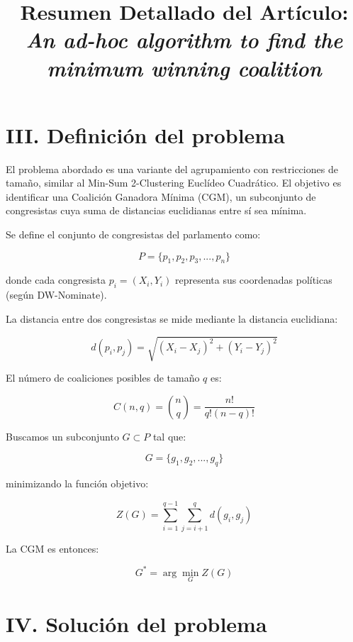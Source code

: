 \documentclass[12pt]{article}
\title{Resumen Detallado del Artículo: \\
\textit{An ad-hoc algorithm to find the minimum winning coalition}}
\author{}
\date{}
\begin{document}
\maketitle

\section*{III. Definición del problema}

El problema abordado es una variante del agrupamiento con restricciones de tamaño, similar al Min-Sum 2-Clustering Euclídeo Cuadrático. El objetivo es identificar una Coalición Ganadora Mínima (CGM), un subconjunto de congresistas cuya suma de distancias euclidianas entre sí sea mínima.

Se define el conjunto de congresistas del parlamento como:

\begin{equation}
P = \{p_1, p_2, p_3, ..., p_n\}
\end{equation}

donde cada congresista \( p_i = (X_i, Y_i) \) representa sus coordenadas políticas (según DW-Nominate).

La distancia entre dos congresistas se mide mediante la distancia euclidiana:

\[
d(p_i, p_j) = \sqrt{(X_i - X_j)^2 + (Y_i - Y_j)^2}
\]

El número de coaliciones posibles de tamaño \( q \) es:

\begin{equation}
C(n, q) = \binom{n}{q} = \frac{n!}{q!(n - q)!}
\end{equation}

Buscamos un subconjunto \( G \subset P \) tal que:

\begin{equation}
G = \{g_1, g_2, ..., g_q\}
\end{equation}

minimizando la función objetivo:

\begin{equation}
Z(G) = \sum_{i=1}^{q-1} \sum_{j=i+1}^{q} d(g_i, g_j)
\end{equation}

La CGM es entonces:

\begin{equation}
G^* = \arg\min_G Z(G)
\end{equation}

\section*{IV. Solución del problema}
\end{document}
